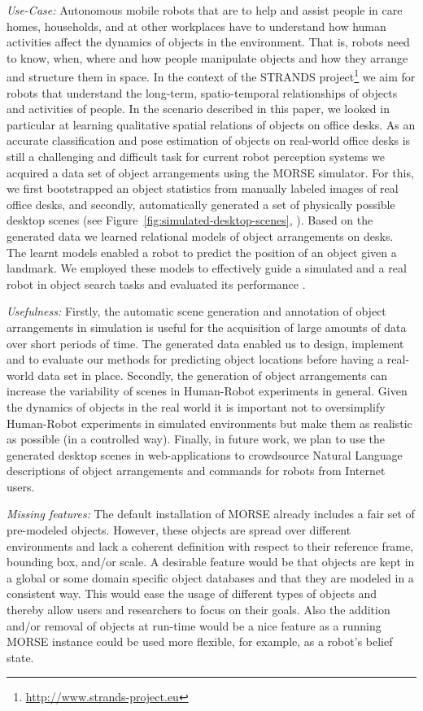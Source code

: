 \documentclass[conference]{IEEEtran}
\begin{document}
\emph{Use-Case:} Autonomous mobile robots that are to help and assist people in
care homes, households, and at other workplaces have to understand how human
activities affect the dynamics of objects in the environment. That is, robots
need to know, when, where and how people manipulate objects and how they
arrange and structure them in space. In the context of the STRANDS
project\footnote{\url{http://www.strands-project.eu}} we aim for robots that
understand the long-term, spatio-temporal relationships of objects and
activities of people. In the scenario described in this paper, we looked in
particular at learning qualitative spatial relations of objects on office
desks. As an accurate classification and pose estimation of objects on
real-world office desks is still a challenging and difficult task for current
robot perception systems we acquired a data set of object arrangements using
the MORSE simulator. For this, we first bootstrapped an object statistics from
manually labeled images of real office desks, and secondly, automatically
generated a set of physically possible desktop scenes (see
Figure~\ref{fig:simulated-desktop-scenes}, \cite{kunze14bootstrapping}). Based
on the generated data we learned relational models of object arrangements on
desks. The learnt models enabled a robot to predict the position of an object
given a landmark. We employed these models to effectively guide a simulated and
a real robot in object search tasks and evaluated its performance
\cite{kunze14indirect}.

\emph{Usefulness:} Firstly, the automatic scene generation and annotation of
object arrangements in simulation is useful for the acquisition of large
amounts of data over short periods of time. The generated data enabled us to
design, implement and to evaluate our methods for predicting object locations
before having a real-world data set in place. Secondly, the generation of
object arrangements can increase the variability of scenes in Human-Robot
experiments in general. Given the dynamics of objects in the real world it is
important not to oversimplify Human-Robot experiments in simulated environments
but make them as realistic as possible (in a controlled way). Finally, in
future work, we plan to use the generated desktop scenes in web-applications to
crowdsource Natural Language descriptions of object arrangements and commands
for robots from Internet users.

\emph{Missing features:} The default installation of MORSE already includes a
fair set of pre-modeled objects. However, these objects are spread over
different environments and lack a coherent definition with respect to their
reference frame, bounding box, and/or scale. A desirable feature would be that
objects are kept in a global or some domain specific object databases and that
they are modeled in a consistent way. This would ease the usage of different
types of objects and thereby allow users and researchers to focus on their
goals. Also the addition and/or removal of objects at run-time would be a nice
feature as a running MORSE instance could be used more flexible, for example,
as a robot's belief state.
\end{document}
